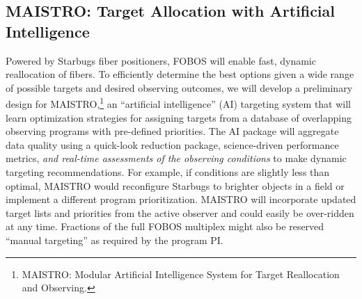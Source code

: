 \documentclass[oneside,11pt]{amsart}
\begin{document}

\subsection{MAISTRO: Target Allocation with Artificial Intelligence}
\label{sec:targeting}

Powered by Starbugs fiber positioners, FOBOS will enable fast, dynamic
reallocation of fibers.  To efficiently determine the best options given
a wide range of possible targets and desired observing outcomes, we will
develop a preliminary design for MAISTRO,\footnote{MAISTRO: Modular
Artificial Intelligence System for Target Reallocation and Observing.}
an ``artificial intelligence'' (AI) targeting system that will learn
optimization strategies for assigning targets from a database of
overlapping observing programs with pre-defined priorities.  The AI
package will aggregate data quality using a quick-look reduction
package, science-driven performance metrics, {\it and real-time
assessments of the observing conditions} to make dynamic targeting
recommendations.  For example, if conditions are slightly less than
optimal, MAISTRO would reconfigure Starbugs to brighter objects in a
field or implement a different program prioritization.  MAISTRO will
incorporate updated target lists and priorities from the active observer
and could easily be over-ridden at any time.   Fractions of the full
FOBOS multiplex might also be reserved ``manual targeting'' as required
by the program PI.  


\end{document}
